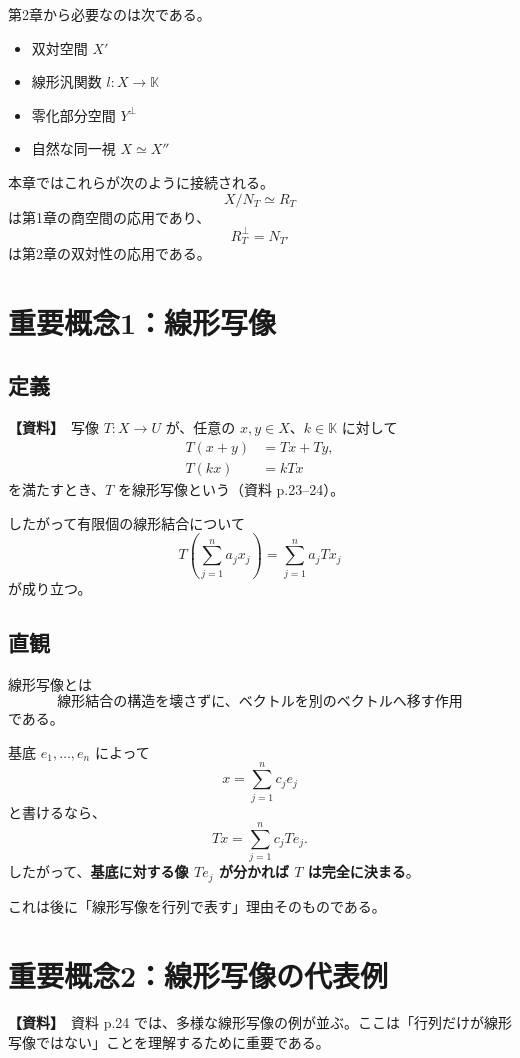 \documentclass[a4paper,11pt]{ltjsarticle}
\newcommand{\K}{\mathbb{K}}
\newcommand{\sourceitem}{\textbf{【資料】}}
\begin{document}
第2章から必要なのは次である。
\begin{itemize}
  \item 双対空間 $X'$
  \item 線形汎関数 $l:X\to \K$
  \item 零化部分空間 $Y^\perp$
  \item 自然な同一視 $X\simeq X''$
\end{itemize}

本章ではこれらが次のように接続される。
\[
\boxed{X/N_T\simeq R_T}
\]
は第1章の商空間の応用であり、
\[
\boxed{R_T^\perp=N_{T'}}
\]
は第2章の双対性の応用である。

\section{重要概念1：線形写像}

\subsection{定義}
\sourceitem\ 写像 $T:X\to U$ が、任意の $x,y\in X$、$k\in\K$ に対して
\begin{align}
T(x+y)&=Tx+Ty,\\
T(kx)&=kTx
\end{align}
を満たすとき、$T$ を線形写像という（資料 p.23--24）。

したがって有限個の線形結合について
\[
T\left(\sum_{j=1}^{n}a_jx_j\right)
=\sum_{j=1}^{n}a_jTx_j
\]
が成り立つ。

\subsection{直観}
線形写像とは
\[
\boxed{\text{線形結合の構造を壊さずに、ベクトルを別のベクトルへ移す作用}}
\]
である。

基底 $e_1,\dots,e_n$ によって
\[
x=\sum_{j=1}^{n}c_je_j
\]
と書けるなら、
\[
Tx=\sum_{j=1}^{n}c_jTe_j.
\]
したがって、\textbf{基底に対する像 $Te_j$ が分かれば $T$ は完全に決まる}。

これは後に「線形写像を行列で表す」理由そのものである。

\section{重要概念2：線形写像の代表例}

\sourceitem\ 資料 p.24 では、多様な線形写像の例が並ぶ。ここは「行列だけが線形写像ではない」ことを理解するために重要である。
\end{document}
